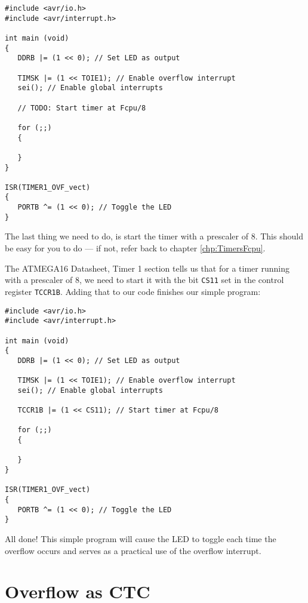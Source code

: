 \documentclass[a4paper,oneside,notitlepage]{book}
\begin{document}
\begin{center}
\begin{lstlisting}
#include <avr/io.h>
#include <avr/interrupt.h>

int main (void)
{
   DDRB |= (1 << 0); // Set LED as output

   TIMSK |= (1 << TOIE1); // Enable overflow interrupt
   sei(); // Enable global interrupts

   // TODO: Start timer at Fcpu/8

   for (;;)
   {

   }
}

ISR(TIMER1_OVF_vect)
{
   PORTB ^= (1 << 0); // Toggle the LED
}
\end{lstlisting}
\end{center}

The last thing we need to do, is start the timer with a prescaler of 8. This should be easy for you to do --- if not, refer back to chapter \ref{chp:TimersFcpu}.

The ATMEGA16 Datasheet, Timer 1 section tells us that for a timer running with a prescaler of 8, we need to start it with the bit \texttt{CS11} set in the control register \texttt{TCCR1B}. Adding that to our code finishes our simple program: 

\begin{center}
\begin{lstlisting}
#include <avr/io.h>
#include <avr/interrupt.h>

int main (void)
{
   DDRB |= (1 << 0); // Set LED as output

   TIMSK |= (1 << TOIE1); // Enable overflow interrupt
   sei(); // Enable global interrupts

   TCCR1B |= (1 << CS11); // Start timer at Fcpu/8

   for (;;)
   {

   }
}

ISR(TIMER1_OVF_vect)
{
   PORTB ^= (1 << 0); // Toggle the LED
}
\end{lstlisting}
\end{center}

All done! This simple program will cause the LED to toggle each time the overflow occurs and serves as a practical use of the overflow interrupt. 


\label{chp:OverflowCTC}
\chapter{Overflow as CTC}
\end{document}
